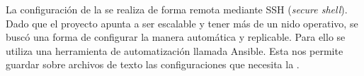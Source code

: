 La configuración de la \rspi se realiza de forma remota mediante SSH (\textit{secure shell}). Dado que el proyecto apunta a ser escalable y tener más de un nido operativo, se buscó una forma de configurar la \rpi manera automática y replicable. Para ello se utiliza una herramienta de automatización llamada Ansible. Esta nos permite guardar sobre archivos de texto las configuraciones que necesita la \rspi.

